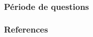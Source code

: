 \documentclass[aspectratio=169,10pt,xcolor=x11names,english,french]{beamer}
\begin{document}
	\begin{frame}
		\frametitle{Période de questions}
		
		\centering
		\fontsize{100}{100}
		\faQuestion
		
	\end{frame}

	
	
	\begin{frame}[t, allowframebreaks]
		\frametitle{References}
		
		
	\end{frame}
	
	
	
\end{document}
